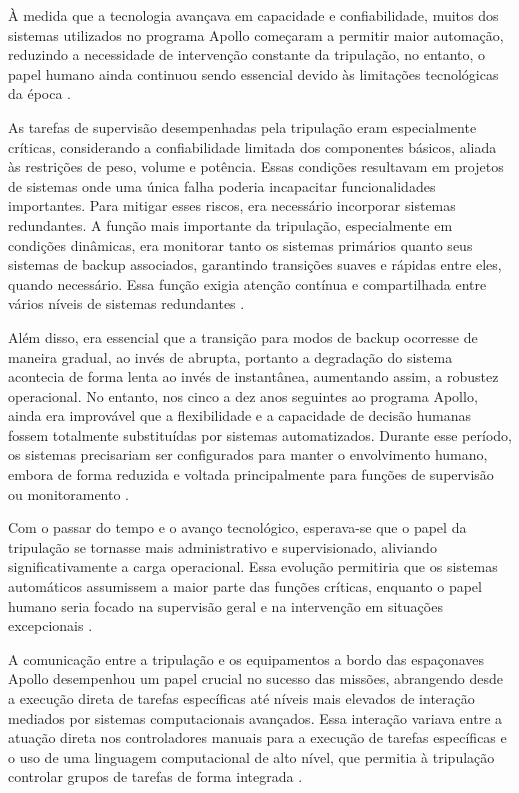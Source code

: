 À medida que a tecnologia avançava em capacidade e confiabilidade, muitos dos sistemas utilizados no programa Apollo começaram a permitir maior automação, reduzindo a necessidade de intervenção constante da tripulação, no entanto, o papel humano ainda continuou sendo essencial devido às limitações tecnológicas da época \cite{nevins1971}.

As tarefas de supervisão desempenhadas pela tripulação eram especialmente críticas, considerando a confiabilidade limitada dos componentes básicos, aliada às restrições de peso, volume e potência. Essas condições resultavam em projetos de sistemas onde uma única falha poderia incapacitar funcionalidades importantes. Para mitigar esses riscos, era necessário incorporar sistemas redundantes. A função mais importante da tripulação, especialmente em condições dinâmicas, era monitorar tanto os sistemas primários quanto seus sistemas de backup associados, garantindo transições suaves e rápidas entre eles, quando necessário. Essa função exigia atenção contínua e compartilhada entre vários níveis de sistemas redundantes \cite{nevins1971}.

Além disso, era essencial que a transição para modos de backup ocorresse de maneira gradual, ao invés de abrupta, portanto a degradação do sistema acontecia de forma lenta ao invés de instantânea, aumentando assim, a robustez operacional. No entanto, nos cinco a dez anos seguintes ao programa Apollo, ainda era improvável que a flexibilidade e a capacidade de decisão humanas fossem totalmente substituídas por sistemas automatizados. Durante esse período, os sistemas precisariam ser configurados para manter o envolvimento humano, embora de forma reduzida e voltada principalmente para funções de supervisão ou monitoramento \cite{nevins1971}.

Com o passar do tempo e o avanço tecnológico, esperava-se que o papel da tripulação se tornasse mais administrativo e supervisionado, aliviando significativamente a carga operacional. Essa evolução permitiria que os sistemas automáticos assumissem a maior parte das funções críticas, enquanto o papel humano seria focado na supervisão geral e na intervenção em situações excepcionais \cite{nevins1971}.

A comunicação entre a tripulação e os equipamentos a bordo das espaçonaves Apollo desempenhou um papel crucial no sucesso das missões, abrangendo desde a execução direta de tarefas específicas até níveis mais elevados de interação mediados por sistemas computacionais avançados. Essa interação variava entre a atuação direta nos controladores manuais para a execução de tarefas específicas e o uso de uma linguagem computacional de alto nível, que permitia à tripulação controlar grupos de tarefas de forma integrada \cite{nevins1971}.

